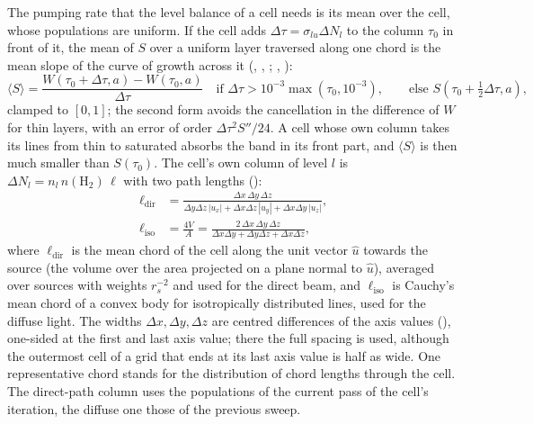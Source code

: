 The pumping rate that the level balance of a cell needs is its mean over the
cell, whose populations are uniform. If the cell adds $\Delta\tau=\sigma_{lu}\Delta N_l$
to the column $\tau_0$ in front of it, the mean of $S$ over a uniform layer
traversed along one chord is the mean slope of the curve of growth across it
(, , ;
, ):
\begin{equation}
  \langle S\rangle = \frac{W(\tau_0+\Delta\tau,a)-W(\tau_0,a)}{\Delta\tau}
  \quad\text{if }\Delta\tau > 10^{-3}\max(\tau_0,10^{-3}),
  \qquad\text{else } S(\tau_0+\tfrac12\Delta\tau,a),
  \label{eq:cellavg}
\end{equation}
clamped to $[0,1]$; the second form avoids the cancellation in the difference
of $W$ for thin layers, with an error of order $\Delta\tau^2 S''/24$. A cell whose own
column takes its lines from thin to saturated absorbs the band in its front
part, and $\langle S\rangle$ is then much smaller than $S(\tau_0)$. The cell's own
column of level $l$ is $\Delta N_l = n_l\,n(\mathrm{H_2})\,\ell$ with two path
lengths ():
\begin{align}
  \ell_{\mathrm{dir}} &= \frac{\Delta x\,\Delta y\,\Delta z}{\Delta y\Delta z\,|u_x|+\Delta x\Delta z\,|u_y|+\Delta x\Delta y\,|u_z|},\\
  \ell_{\mathrm{iso}} &= \frac{4V}{A} = \frac{2\,\Delta x\,\Delta y\,\Delta z}{\Delta x\Delta y+\Delta y\Delta z+\Delta x\Delta z},
\end{align}
where $\ell_{\mathrm{dir}}$ is the mean chord of the cell along the unit vector
$\hat u$ towards the source (the volume over the area projected on a plane
normal to $\hat u$), averaged over sources with weights $r_s^{-2}$ and used for
the direct beam, and $\ell_{\mathrm{iso}}$ is Cauchy's mean chord of a convex body
for isotropically distributed lines, used for the diffuse light. The widths
$\Delta x,\Delta y,\Delta z$ are centred differences of the axis values
(), one-sided at the first and last axis value; there the full
spacing is used, although the outermost cell of a grid that ends at its last
axis value is half as wide. One representative chord stands for the
distribution of chord lengths through the cell. The direct-path column uses
the populations of the current pass of the cell's iteration, the diffuse one
those of the previous sweep.

